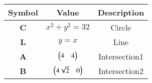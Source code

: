 \begin{tabular}[12pt]{ |c|c|c|}
    \hline
    \textbf{Symbol} & \textbf{Value} & \textbf{Description} \\
    \hline
    \textbf{C} & $x^{2}+y^{2}=32$ & Circle\\
    \hline
    \textbf{L} & $y=x$ & Line\\
    \hline
    \textbf{A} & $\begin{pmatrix}4 & 4\end{pmatrix}$ & Intersection1\\
    \hline
    \textbf{B} & $\begin{pmatrix}4\sqrt{2} & 0\end{pmatrix}$ & Intersection2\\
    \hline
    \end{tabular}
